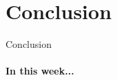 \section{Conclusion}

\begin{frame}{Conclusion}
    \framesubtitle{In this week...}
    
\end{frame}